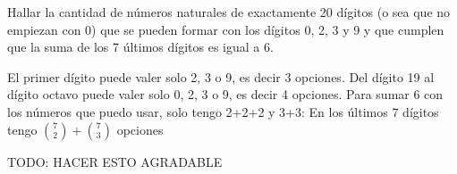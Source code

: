 \begin{enunciado}{\ejExtra}
        Hallar la cantidad de números naturales de exactamente 20 dígitos (o sea que no empiezan con 0) que se pueden
        formar con los dígitos 0, 2, 3 y 9 y que cumplen que la suma de los 7 últimos dígitos es igual a 6.
\end{enunciado}

El primer dígito puede valer solo 2, 3 o 9, es decir 3 opciones.
Del dígito 19 al dígito octavo puede valer solo 0, 2, 3 o 9, es decir 4 opciones. 
Para sumar 6 con los números que puedo usar, solo tengo 2+2+2 y 3+3:
En los últimos 7 dígitos tengo $\binom{7}{2} + \binom{7}{3}$ opciones

TODO:
HACER ESTO AGRADABLE
